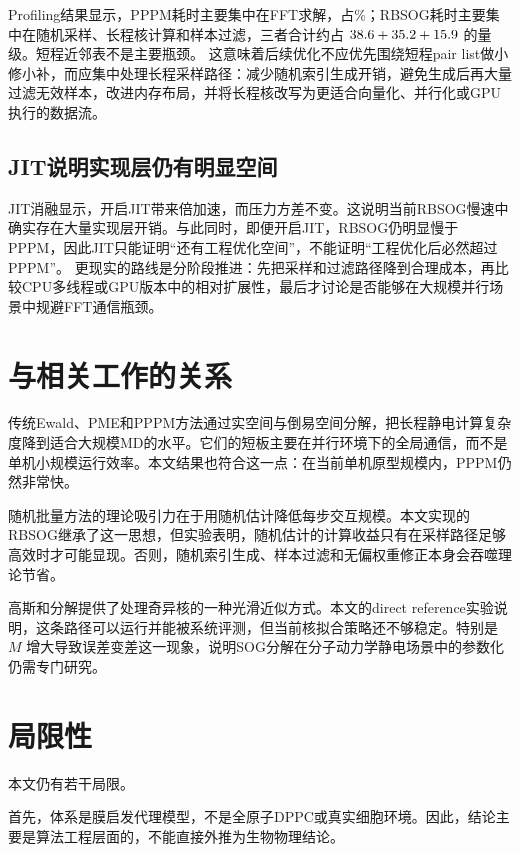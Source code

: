 Profiling结果显示，PPPM耗时主要集中在FFT求解，占\PPPMFFTShare\%；RBSOG耗时主要集中在随机采样、长程核计算和样本过滤，三者合计约占 $38.6 + 35.2 + 15.9$ 的量级。短程近邻表不是主要瓶颈。
这意味着后续优化不应优先围绕短程pair list做小修小补，而应集中处理长程采样路径：减少随机索引生成开销，避免生成后再大量过滤无效样本，改进内存布局，并将长程核改写为更适合向量化、并行化或GPU执行的数据流。

\subsection{JIT说明实现层仍有明显空间}

JIT消融显示，开启JIT带来\JITSpeedup 倍加速，而压力方差不变。这说明当前RBSOG慢速中确实存在大量实现层开销。与此同时，即便开启JIT，RBSOG仍明显慢于PPPM，因此JIT只能证明“还有工程优化空间”，不能证明“工程优化后必然超过PPPM”。
更现实的路线是分阶段推进：先把采样和过滤路径降到合理成本，再比较CPU多线程或GPU版本中的相对扩展性，最后才讨论是否能够在大规模并行场景中规避FFT通信瓶颈。

\section{与相关工作的关系}

传统Ewald、PME和PPPM方法通过实空间与倒易空间分解，把长程静电计算复杂度降到适合大规模MD的水平\cite{darden1993particle,hockney1988computer}。它们的短板主要在并行环境下的全局通信，而不是单机小规模运行效率。本文结果也符合这一点：在当前单机原型规模内，PPPM仍然非常快。

随机批量方法的理论吸引力在于用随机估计降低每步交互规模\cite{jin2020random}。本文实现的RBSOG继承了这一思想，但实验表明，随机估计的计算收益只有在采样路径足够高效时才可能显现。否则，随机索引生成、样本过滤和无偏权重修正本身会吞噬理论节省。

高斯和分解提供了处理奇异核的一种光滑近似方式\cite{guo2025sum}。本文的direct reference实验说明，这条路径可以运行并能被系统评测，但当前核拟合策略还不够稳定。特别是 $M$ 增大导致误差变差这一现象，说明SOG分解在分子动力学静电场景中的参数化仍需专门研究。

\section{局限性}

本文仍有若干局限。

首先，体系是膜启发代理模型，不是全原子DPPC或真实细胞环境。因此，结论主要是算法工程层面的，不能直接外推为生物物理结论。

